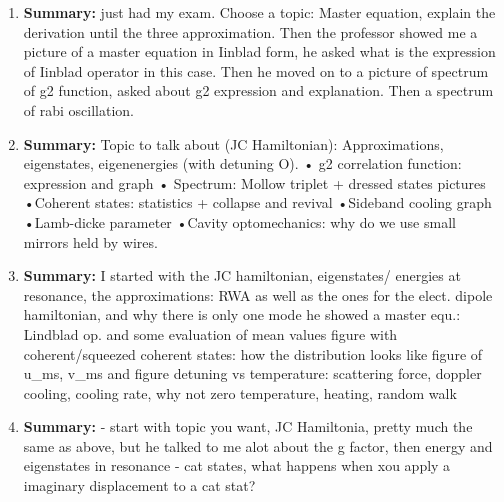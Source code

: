 \documentclass{article}%
\begin{document}
\begin{enumerate}%
\item%
\begin{mycolorbox}%
\textbf{Summary:}%
\newline%
just had my exam.\newline%
Choose a topic: Master equation, explain the derivation until the three approximation. Then the professor showed me a picture of a master equation in Iinblad form, he asked what is the expression of Iinblad operator in this case. Then he moved on to a picture of spectrum of g2 function, asked about g2 expression and explanation. Then a spectrum of rabi oscillation.%
\end{mycolorbox}%
\item%
\textbf{Summary:}%
\newline%
Topic to talk about (JC Hamiltonian): Approximations, eigenstates, eigenenergies (with detuning O).\newline%
 • g2 correlation function: expression and graph\newline%
 • Spectrum: Mollow triplet + dressed states pictures\newline%
 •Coherent states: statistics + collapse and revival\newline%
 •Sideband cooling graph\newline%
 •Lamb{-}dicke parameter\newline%
 •Cavity optomechanics: why do we use small mirrors held by wires.%
\item%
\begin{mycolorbox}%
\textbf{Summary:}%
\newline%
I started with the JC hamiltonian, eigenstates/ energies at resonance, the approximations: RWA as well as the ones for the elect. dipole hamiltonian, and why there is only one mode he showed a master equ.: Lindblad op. and some evaluation of mean values figure with coherent/squeezed coherent states: how the distribution looks like figure of u\_ms, v\_ms and figure detuning vs temperature: scattering force, doppler cooling, cooling rate, why not zero temperature, heating, random walk%
\end{mycolorbox}%
\item%
\textbf{Summary:}%
\newline%
{-} start with topic you want, JC Hamiltonia, pretty much the same as above, but he talked to me alot about the g factor, then energy and eigenstates in resonance\newline%
{-} cat states, what happens when xou apply a imaginary displacement to a cat stat?\newline%

\end{enumerate}
\end{document}
